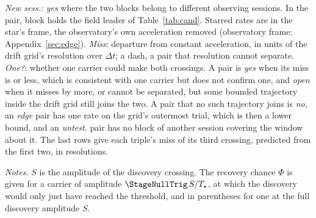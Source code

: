 \begin{table}
\centering
\caption{\textbf{Can two crossings be one carrier?} The \TjNPair{} pairs
toward one star with an unattributed member, and each HD~14055 triple
(\S\ref{sec:etacrv}).}
\label{tab:pairs}
\scriptsize

\par\vspace{2pt}

\par\vspace{2pt}
{\scriptsize \emph{New sess.}: \emph{yes} where the two blocks belong to
different observing sessions. In the \EvAStar{} pair, block \LrFlBlock{}
holds the field leader of Table~\ref{tab:cand}. Starred rates are in the star's frame, the
observatory's own acceleration removed (observatory frame:
Appendix~\ref{sec:edge}). \emph{Miss}: departure from constant
acceleration, in units of the drift grid's resolution over $\Delta t$; a
dash, a pair that resolution cannot separate. \emph{One?}: whether one
carrier could make both crossings. A pair is \emph{yes} when its miss is
\TjAcceptSig{} or less, which is consistent with one carrier but does not
confirm one, and \emph{open} when it misses by more, or cannot be
separated, but some bounded trajectory inside the drift grid still joins the
two. A pair that no such
trajectory joins is \emph{no}, an \emph{edge} pair has one rate on the
grid's outermost trial, which is then a lower bound, and an \emph{untest.}
pair has no block of another session covering the window about it. The
last rows give each triple's miss of its third crossing, predicted from the
first two, in resolutions.\par}
\end{table}

\begin{table}
\centering
\caption{\textbf{The field leader}, the crossing whose stellar statistic
exceeds all \NCtrl{} control positions of its own window
(\S\ref{sec:vistest}).}
\label{tab:cand}
\footnotesize

\par\vspace{2pt}
{\scriptsize \emph{Notes.} $S$ is the amplitude of the discovery crossing.
The recovery chance $\Phi$ is given for a carrier of amplitude $\StageNullTrig\,S/T_\star$,
at which the discovery would only just have reached the threshold, and in
parentheses for one at the full discovery amplitude $S$.\par}
\end{table}
